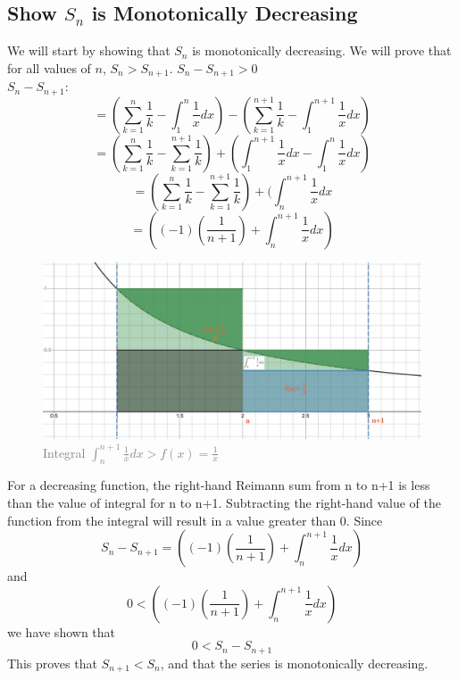 \documentclass{article}
\begin{document}
\subsection{Show $S_n$ is Monotonically Decreasing}
We will start by showing that $S_n$ is monotonically decreasing.   We will prove that for all values of $n$, $S_n > S_{n+1}$. $S_n-S_{n+1}>0$\\
$S_n-S_{n+1}$:
$$=(\sum_{k=1}^{n}\frac{1}{k} - \int_{1}^{n} \frac{1}{x}dx)-(\sum_{k=1}^{n+1}\frac{1}{k} - \int_{1}^{n+1} \frac{1}{x}dx)$$
$$=(\sum_{k=1}^{n}\frac{1}{k}-\sum_{k=1}^{n+1}\frac{1}{k})+ (\int_{1}^{n+1} \frac{1}{x}dx-\int_{1}^{n} \frac{1}{x}dx)$$
$$=(\sum_{k=1}^{n}\frac{1}{k}-\sum_{k=1}^{n+1}\frac{1}{k})+(\int_{n}^{n+1} \frac{1}{x}dx$$
$$=((-1)(\frac{1}{n+1})+\int_{n}^{n+1} \frac{1}{x}dx)$$
\begin{center}
\begin{figure}[htp]
    \centering
    \includegraphics[scale=0.25]{n and n+1 zoomed in more rev1.jpg}
    \caption{\textcolor{Gray}{Integral $\int_n^{n+1} \frac{1}{x}dx > f(x)=\frac{1}{x}$}}
    \label{fig:Riemann Sums}
\end{figure}    
\end{center}
For a decreasing function, the right-hand Reimann sum from n to n+1 is less than the value of integral for n to n+1.
Subtracting the right-hand value of the function from the integral will result in a value greater than 0. 
Since $$S_n-S_{n+1}=((-1)(\frac{1}{n+1})+\int_{n}^{n+1} \frac{1}{x}dx)$$
and
$$0<((-1)(\frac{1}{n+1})+\int_{n}^{n+1} \frac{1}{x}dx)$$
we have shown that
$$0<S_n-S_{n+1}$$
This proves that $S_{n+1}<S_n$, and that the series is monotonically decreasing.
\FloatBarrier
\end{document}

